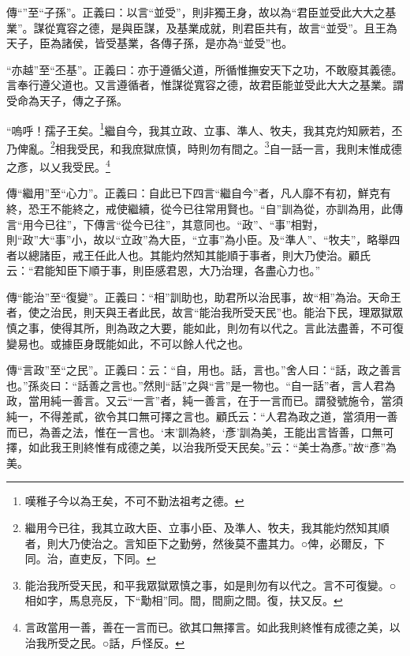{\noindent\zhuan{}\fzbyks 傳“”至“子孫”。正義曰：以言“並受”，則非獨王身，故以為“君臣並受此大大之基業”。謀從寬容之德，是與臣謀，及基業成就，則君臣共有，故言“並受”。且王為天子，臣為諸侯，皆受基業，各傳子孫，是亦為“並受”也。 \par}

{\noindent\shu{}\fzkt “亦越”至“丕基”。正義曰：亦于遵循父道，所循惟撫安天下之功，不敢廢其義德。言奉行遵父道也。又言遵循者，惟謀從寬容之德，故君臣能並受此大大之基業。謂受命為天子，傳之子孫。 \par}

“嗚呼！孺子王矣。\footnote{嘆稚子今以為王矣，不可不勤法祖考之德。}繼自今，我其立政、立事、準人、牧夫，我其克灼知厥若，丕乃俾亂。\footnote{繼用今已往，我其立政大臣、立事小臣、及準人、牧夫，我其能灼然知其順者，則大乃使治之。言知臣下之勤勞，然後莫不盡其力。○俾，必爾反，下同。治，直吏反，下同。}相我受民，和我庶獄庶慎，時則勿有間之。\footnote{能治我所受天民，和平我眾獄眾慎之事，如是則勿有以代之。言不可復變。○相如字，馬息亮反，下“勱相”同。間，間廁之間。復，扶又反。}自一話一言，我則末惟成德之彥，以乂我受民。\footnote{言政當用一善，善在一言而已。欲其口無擇言。如此我則終惟有成德之美，以治我所受之民。○話，戶怪反。}


{\noindent\zhuan{}\fzbyks 傳“繼用”至“心力”。正義曰：自此已下四言“繼自今”者，凡人靡不有初，鮮克有終，恐王不能終之，戒使繼續，從今已往常用賢也。“自”訓為從，亦訓為用，此傳言“用今已往”，下傳言“從今已往”，其意同也。“政”、“事”相對，則“政”大“事”小，故以“立政”為大臣，“立事”為小臣。及“準人”、“牧夫”，略舉四者以總諸臣，戒王任此人也。其能灼然知其能順于事者，則大乃使治。顧氏云：“君能知臣下順于事，則臣感君恩，大乃治理，各盡心力也。” \par}

{\noindent\zhuan{}\fzbyks 傳“能治”至“復變”。正義曰：“相”訓助也，助君所以治民事，故“相”為治。天命王者，使之治民，則天與王者此民，故言“能治我所受天民”也。能治下民，理眾獄眾慎之事，使得其所，則為政之大要，能如此，則勿有以代之。言此法盡善，不可復變易也。或據臣身既能如此，不可以餘人代之也。 \par}

{\noindent\zhuan{}\fzbyks 傳“言政”至“之民”。正義曰：云：“自，用也。話，言也。”舍人曰：“話，政之善言也。”孫炎曰：“話善之言也。”然則“話”之與“言”是一物也。“自一話”者，言人君為政，當用純一善言。又云“一言”者，純一善言，在于一言而已。謂發號施令，當須純一，不得差貳，欲令其口無可擇之言也。顧氏云：“人君為政之道，當須用一善而已，為善之法，惟在一言也。‘末’訓為終，‘彥’訓為美，王能出言皆善，口無可擇，如此我王則終惟有成德之美，以治我所受天民矣。”云：“美士為彥。”故“彥”為美。 \par}

